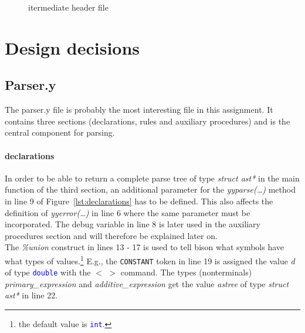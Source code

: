 \documentclass{scrartcl}
\begin{document}
\begin{figure}[H]

\caption{itermediate header file}
\label{lst:header}
\end{figure}

\section*{Design decisions}

\subsection*{Parser.y}
The parser.y file is probably the most interesting file in this assignment. It contains three sections (declarations, rules and auxiliary procedures) and is the central component for parsing.
\paragraph*{declarations}
In order to be able to return a complete parse tree of type \textit{struct ast*} in the main function of the third section, an additional parameter for the \textit{yyparse(\ldots)} method in line 9 of Figure~\ref{lst:declarations} has to be defined. This also affects the definition of \textit{yyerror(\ldots)} in line 6 where the same parameter must be incorporated. The debug variable in line 8 is later used in the auxiliary procedures section and will therefore be explained later on.\\
The \textit{\%union} construct in lines 13 - 17 is used to tell bison what symbols have what types of values.\footnote{the default value is \texttt{\textcolor{blue}{int}}.} E.g., the \texttt{CONSTANT} token in line 19 is assigned the value \textit{d} of type \texttt{\textcolor{blue}{double}} with the $<$ $>$ command. The types (nonterminals) \textit{primary\_expression} and \textit{additive\_expression} get the value \textit{astree} of type \textit{struct ast*} in line 22. 
\end{document}
